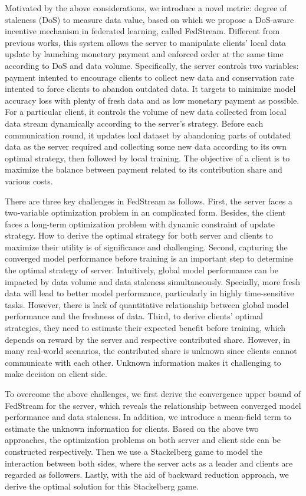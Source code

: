 \documentclass{article}
\theoremstyle{plain}
\theoremstyle{definition}
\theoremstyle{remark}
\begin{document}
Motivated by the above considerations, we introduce a novel metric: degree of staleness (DoS) to measure data value, based on which we propose a DoS-aware incentive mechanism in federated learning, called FedStream.
Different from previous works, this system allows the server to manipulate clients' local data update by launching monetary payment and enforced order at the same time according to DoS and data volume.
Specifically, the server controls two variables: payment intented to encourage clients to collect new data and conservation rate intented to force clients to abandon outdated data. It targets to minimize model accuracy loss with plenty of fresh data and as low monetary payment as possible.
For a particular client, it controls the volume of new data collected from local data stream dynamically according to the server's strategy. Before each communication round, it updates loal dataset by abandoning parts of outdated data as the server required and collecting some new data according to its own optimal strategy, then followed by local training. The objective of a client is to maximize the balance between payment related to its contribution share and various costs.

There are three key challenges in FedStream as follows.
First, the server faces a two-variable optimization problem in an complicated form. Besides, the client faces a long-term optimization problem with dynamic constraint of update strategy. How to derive the optimal strategy for both server and clients to maximize their utility is of significance and challenging.
Second, capturing the converged model performance before training is an important step to determine the optimal strategy of server. Intuitively, global model performance can be impacted by data volume and data staleness simultaneously. Specially, more fresh data will lead to better model performance, particularly in highly time-sensitive tasks. However, there is lack of quantitative relationship between global model performance and the freshness of data.
Third, to derive clients' optimal strategies, they need to estimate their expected benefit before training, which depends on reward by the server and respective contributed share. However, in many real-world scenarios, the contributed share is unknown since clients cannot communicate with each other. Unknown information makes it challenging to make decision on client side.

To overcome the above challenges, we first derive the convergence upper bound of FedStream for the server, which reveals the relationship between converged model performance and data staleness.
In addition, we introduce a mean-field term to estimate the unknown information for clients.
Based on the above two approaches, the optimization problems on both server and client side can be constructed respectively.
Then we use a Stackelberg game to model the interaction between both sides, where the server acts as a leader and clients are regarded as followers.
Lastly, with the aid of backward reduction approach, we derive the optimal solution for this Stackelberg game.
\end{document}
